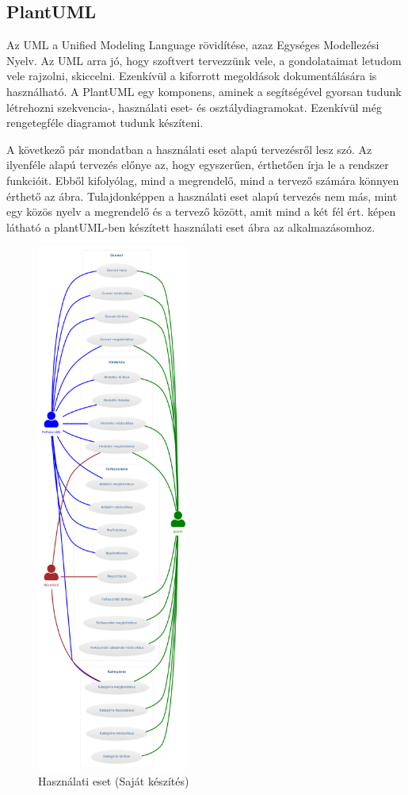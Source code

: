 \documentclass[]{thesis-ekf}
\theoremstyle{definition}
\theoremstyle{remark}
\begin{document}
	\subsection{PlantUML}
	Az UML a Unified Modeling Language rövidítése, azaz Egységes Modellezési Nyelv. Az UML arra jó, hogy szoftvert tervezzünk vele, a gondolataimat letudom vele rajzolni, skiccelni. Ezenkívül a kiforrott megoldások dokumentálására is használható. A PlantUML egy komponens, aminek a segítségével gyorsan tudunk létrehozni szekvencia-, használati eset- és osztálydiagramokat. Ezenkívül még rengetegféle diagramot tudunk készíteni. \cite{PlantUML}
	
	A következő pár mondatban a használati eset alapú tervezésről lesz szó. Az ilyenféle alapú tervezés előnye az, hogy egyszerűen, érthetően írja le a rendszer funkcióit. Ebből kifolyólag, mind a megrendelő, mind a tervező számára könnyen érthető az ábra. Tulajdonképpen a használati eset alapú tervezés nem más, mint egy közös nyelv a megrendelő és a tervező között, amit mind a két fél ért.\cite{Kusper Informatikai}  képen látható a plantUML-ben készített használati eset ábra az alkalmazásomhoz.
	\begin{figure}[ht!]
		\centering
		\includegraphics[width=5cm]{./tervezes/useCase}
		\caption{Használati eset (Saját készítés)} 
		\label{useCase}
	\end{figure}
	
\end{document}
